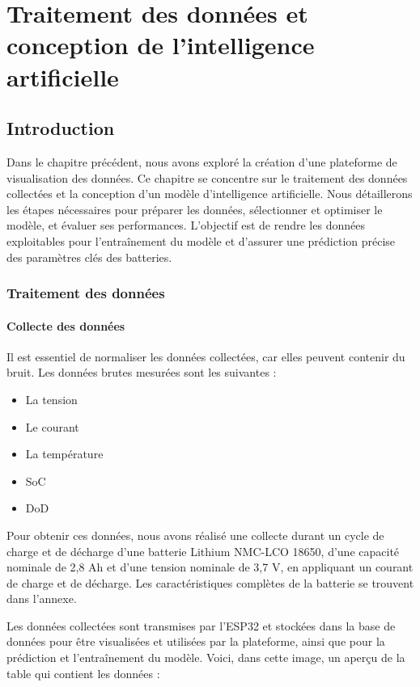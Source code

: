 \chapter{Traitement des données et conception de l'intelligence artificielle}

\section{Introduction}
Dans le chapitre précédent, nous avons exploré la création d'une plateforme de visualisation des données. Ce chapitre se concentre sur le traitement des données collectées et la conception d'un modèle d'intelligence artificielle. Nous détaillerons les étapes nécessaires pour préparer les données, sélectionner et optimiser le modèle, et évaluer ses performances. L'objectif est de rendre les données exploitables pour l'entraînement du modèle et d'assurer une prédiction précise des paramètres clés des batteries.

\subsection{Traitement des données}
\subsubsection{Collecte des données}
Il est essentiel de normaliser les données collectées, car elles peuvent contenir du bruit. Les données brutes mesurées sont les suivantes :
\begin{itemize} 
	\item La tension 
	\item Le courant 
	\item La température
	\item SoC
	\item DoD
 \end{itemize}

Pour obtenir ces données, nous avons réalisé une collecte durant un cycle de charge et de décharge d'une batterie Lithium NMC-LCO 18650, d'une capacité nominale de 2,8 Ah et d'une tension nominale de 3,7 V, en appliquant un courant de charge et de décharge. Les caractéristiques complètes de la batterie se trouvent dans l'annexe. 

Les données collectées sont transmises par l'ESP32 et stockées dans la base de données pour être visualisées et utilisées par la plateforme, ainsi que pour la prédiction et l'entraînement du modèle. Voici, dans cette image, un aperçu de la table qui contient les données :

